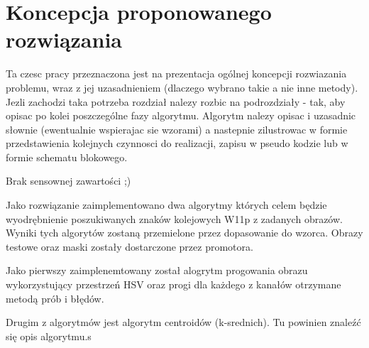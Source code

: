 \chapter{Koncepcja proponowanego rozwiązania}

Ta czesc pracy przeznaczona jest na prezentacja ogólnej koncepcji rozwiazania problemu,
wraz z jej uzasadnieniem (dlaczego wybrano takie a nie inne metody). Jezli zachodzi taka
potrzeba rozdział nalezy rozbic na podrozdziały - tak, aby opisac po kolei poszczególne fazy
algorytmu. Algorytm nalezy opisac i uzasadnic słownie (ewentualnie wspierajac sie wzorami) a
nastepnie zilustrowac w formie przedstawienia kolejnych czynnosci do realizacji, zapisu w
pseudo kodzie lub w formie schematu blokowego.

Brak sensownej zawartości ;)

Jako rozwiązanie zaimplementowano dwa algorytmy których celem będzie wyodrębnienie poszukiwanych znaków kolejowych W11p z zadanych obrazów. Wyniki tych algorytów zostaną przemielone przez dopasowanie do wzorca. Obrazy testowe oraz maski zostały dostarczone przez promotora. 

Jako pierwszy zaimplenemtowany został alogrytm progowania obrazu wykorzystujący przestrzeń HSV oraz progi dla każdego z kanałów otrzymane metodą prób i błędów.

Drugim z algorytmów jest algorytm centroidów (k-srednich). Tu powinien znaleźć się opis algorytmu.s
